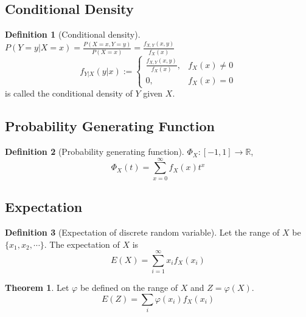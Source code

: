 \documentclass[10pt, a4paper]{extarticle}
\theoremstyle{definition}
\newtheorem{thm}{Theorem}
\newtheorem{defn}{Definition}
\begin{document}
	\subsection{Conditional Density}
	\begin{defn}[Conditional density]
		$P(Y=y|X=x)=\frac{P(X=x,Y=y)}{P(X=x)}=\frac{f_{X,Y}(x,y)}{f_X(x)}$
		\[f_{Y|X}(y|x):=
			\begin{cases}
				\frac{f_{X,Y}(x,y)}{f_X(x)},&f_X(x)\neq 0\\
				0,&f_X(x)=0
			\end{cases}
		\]
		is called the conditional density of $Y$ given $X$.
	\end{defn}
	
	\subsection{Probability Generating Function}
	\begin{defn}[Probability generating function]
		$\Phi_X:[-1,1]\to\mathbb{R}$,
		\[\Phi_X(t)=\sum_{x=0}^\infty f_X(x)t^x\]
	\end{defn}

	\subsection{Expectation}
	\begin{defn}[Expectation of discrete random variable]
		Let the range of $X$ be $\{x_1,x_2,\cdots\}$. The expectation of $X$ is
		\[E(X)=\sum_{i=1}^\infty x_if_X(x_i)\]
	\end{defn}

	\begin{thm}
		Let $\varphi$ be defined on the range of $X$ and $Z=\varphi(X)$.
		\[E(Z)=\sum_{i}\varphi(x_i)f_X(x_i)\]
	\end{thm}
\end{document}

